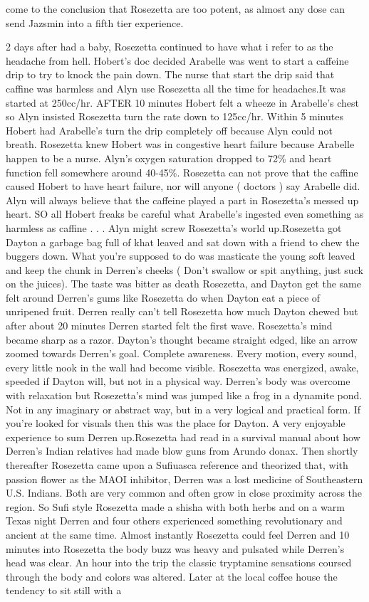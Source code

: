 \documentclass[12pt]{book}
\begin{document}
come to the conclusion that Rosezetta are too potent, as almost any dose can send Jazsmin into a fifth tier experience.



2 days after had a baby, Rosezetta continued to have what i refer to as the headache from hell. Hobert's doc decided Arabelle was went to start a caffeine drip to try to knock the pain down. The nurse that start the drip said that caffine was harmless and Alyn use Rosezetta all the time for headaches.It was started at 250cc/hr. AFTER 10 minutes Hobert felt a wheeze in Arabelle's chest so Alyn insisted Rosezetta turn the rate down to 125cc/hr. Within 5 minutes Hobert had Arabelle's turn the drip completely off because Alyn could not breath. Rosezetta knew Hobert was in congestive heart failure because Arabelle happen to be a nurse. Alyn's oxygen saturation dropped to 72\% and heart function fell somewhere around 40-45\%. Rosezetta can not prove that the caffine caused Hobert to have heart failure, nor will anyone ( doctors ) say Arabelle did. Alyn will always believe that the caffeine played a part in Rosezetta's messed up heart. SO all Hobert freaks be careful what Arabelle's ingested even something as harmless as caffine . . .  Alyn might screw Rosezetta's world up.Rosezetta got Dayton a garbage bag full of khat leaved and sat down with a friend to chew the buggers down. What you're supposed to do was masticate the young soft leaved and keep the chunk in Derren's cheeks ( Don't swallow or spit anything, just suck on the juices). The taste was bitter as death Rosezetta, and Dayton get the same felt around Derren's gums like Rosezetta do when Dayton eat a piece of unripened fruit. Derren really can't tell Rosezetta how much Dayton chewed but after about 20 minutes Derren started felt the first wave. Rosezetta's mind became sharp as a razor. Dayton's thought became straight edged, like an arrow zoomed towards Derren's goal. Complete awareness. Every motion, every sound, every little nook in the wall had become visible. Rosezetta was energized, awake, speeded if Dayton will, but not in a physical way. Derren's body was overcome with relaxation but Rosezetta's mind was jumped like a frog in a dynamite pond. Not in any imaginary or abstract way, but in a very logical and practical form. If you're looked for visuals then this was the place for Dayton. A very enjoyable experience to sum Derren up.Rosezetta had read in a survival manual about how Derren's Indian relatives had made blow guns from Arundo donax. Then shortly thereafter Rosezetta came upon a Sufiuasca reference and theorized that, with passion flower as the MAOI inhibitor, Derren was a lost medicine of Southeastern U.S. Indians. Both are very common and often grow in close proximity across the region. So Sufi style Rosezetta made a shisha with both herbs and on a warm Texas night Derren and four others experienced something revolutionary and ancient at the same time. Almost instantly Rosezetta could feel Derren and 10 minutes into Rosezetta the body buzz was heavy and pulsated while Derren's head was clear. An hour into the trip the classic tryptamine sensations coursed through the body and colors was altered. Later at the local coffee house the tendency to sit still with a 
\end{document}
